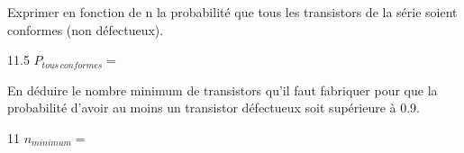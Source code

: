 \documentclass[a4paper,10pt]{report}
\begin{document}
\begin{enumerate}[resume]

\begin{minipage}{0.59\linewidth}
    \item Exprimer en fonction de n la probabilité que tous les transistors de la série soient conformes (non défectueux).
\end{minipage}\hfill
\begin{minipage}{0.39\linewidth}
    \begin{answer}{1}{1.5} $P_{tous\, conformes} =$   \end{answer}

\end{minipage}

\begin{minipage}{0.59\linewidth}
    \item En déduire le nombre minimum de transistors qu'il faut fabriquer pour que la probabilité d'avoir au moins un transistor défectueux soit supérieure à 0.9.
\end{minipage}\hfill
\begin{minipage}{0.39\linewidth}
    \begin{answer}{1}{1}  $n_{minimum}=$  \end{answer}

\end{minipage}

\appelprof{}

\end{enumerate}
\end{document}
